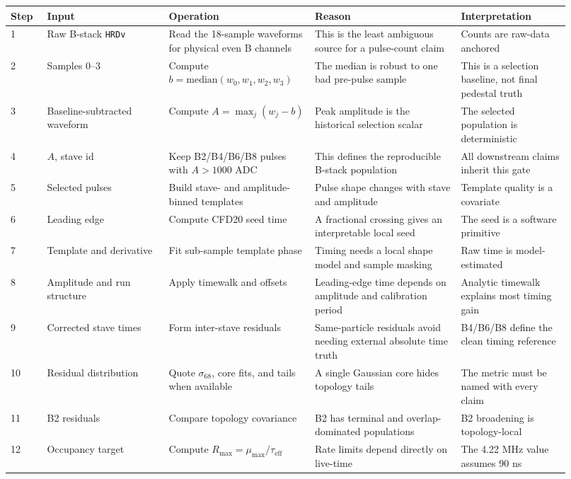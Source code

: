 \begin{longtable}{@{}p{0.06\linewidth}p{0.20\linewidth}p{0.24\linewidth}p{0.24\linewidth}p{0.18\linewidth}@{}}
\toprule
Step & Input & Operation & Reason & Interpretation \\
\midrule
\endhead
1 & Raw B-stack \texttt{HRDv} & Read the 18-sample waveforms for physical even B channels & This is the least ambiguous source for a pulse-count claim & Counts are raw-data anchored \\
2 & Samples 0--3 & Compute \(b=\mathrm{median}(w_0,w_1,w_2,w_3)\) & The median is robust to one bad pre-pulse sample & This is a selection baseline, not final pedestal truth \\
3 & Baseline-subtracted waveform & Compute \(A=\max_j(w_j-b)\) & Peak amplitude is the historical selection scalar & The selected population is deterministic \\
4 & \(A\), stave id & Keep B2/B4/B6/B8 pulses with \(A>1000\) ADC & This defines the reproducible B-stack population & All downstream claims inherit this gate \\
5 & Selected pulses & Build stave- and amplitude-binned templates & Pulse shape changes with stave and amplitude & Template quality is a covariate \\
6 & Leading edge & Compute CFD20 seed time & A fractional crossing gives an interpretable local seed & The seed is a software primitive \\
7 & Template and derivative & Fit sub-sample template phase & Timing needs a local shape model and sample masking & Raw time is model-estimated \\
8 & Amplitude and run structure & Apply timewalk and offsets & Leading-edge time depends on amplitude and calibration period & Analytic timewalk explains most timing gain \\
9 & Corrected stave times & Form inter-stave residuals & Same-particle residuals avoid needing external absolute time truth & B4/B6/B8 define the clean timing reference \\
10 & Residual distribution & Quote \(\sigma_{68}\), core fits, and tails when available & A single Gaussian core hides topology tails & The metric must be named with every claim \\
11 & B2 residuals & Compare topology covariance & B2 has terminal and overlap-dominated populations & B2 broadening is topology-local \\
12 & Occupancy target & Compute \(R_{\max}=\mu_{\max}/\tau_{\mathrm{eff}}\) & Rate limits depend directly on live-time & The 4.22 MHz value assumes 90 ns \\

\end{longtable}
